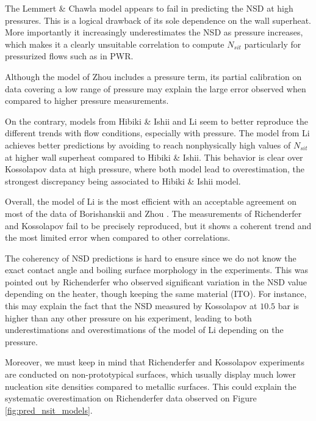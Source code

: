The Lemmert \& Chawla model appears to fail in predicting the NSD at high pressures. This is a logical drawback of its sole dependence on the wall superheat. More importantly it increasingly underestimates the NSD as pressure increases, which makes it a clearly unsuitable correlation to compute $N_{sit}$ particularly for pressurized flows such as in PWR.

\npar
Although the model of Zhou \etal includes a pressure term, its partial calibration on data covering a low range of pressure may explain the large error observed when compared to higher pressure measurements.

\npar
On the contrary, models from Hibiki \& Ishii and Li \etal seem to better reproduce the different trends with flow conditions, especially with pressure. The model from Li \etal achieves better predictions by avoiding to reach nonphysically high values of $N_{sit}$ at higher wall superheat compared to Hibiki \& Ishii. This behavior is clear over Kossolapov data at high pressure, where both model lead to overestimation, the strongest discrepancy being associated to Hibiki \& Ishii model.

\npar
Overall, the model of Li \etal is the most efficient with an acceptable agreement on most of the data of Borishanskii and Zhou \etal. The measurements of Richenderfer and Kossolapov fail to be precisely reproduced, but it shows a coherent trend and the most limited error when compared to other correlations.

\npar
\begin{remark*}{}
The coherency of NSD predictions is hard to ensure since we do not know the exact contact angle and boiling surface morphology in the experiments. This was pointed out by Richenderfer \cite{richenderfer_experimental_2018} who observed significant variation in the NSD value depending on the heater, though keeping the same material (ITO). For instance, this may explain the fact that the NSD measured by Kossolapov at $10.5$ bar is higher than any other pressure on his experiment, leading to both underestimations and overestimations of the model of Li \etal depending on the pressure.

\npar

Moreover, we must keep in mind that Richenderfer and Kossolapov experiments are conducted on non-prototypical surfaces, which usually display much lower nucleation site densities compared to metallic surfaces. This could explain the systematic overestimation on Richenderfer data observed on Figure \ref{fig:pred_nsit_models}.
\end{remark*}

